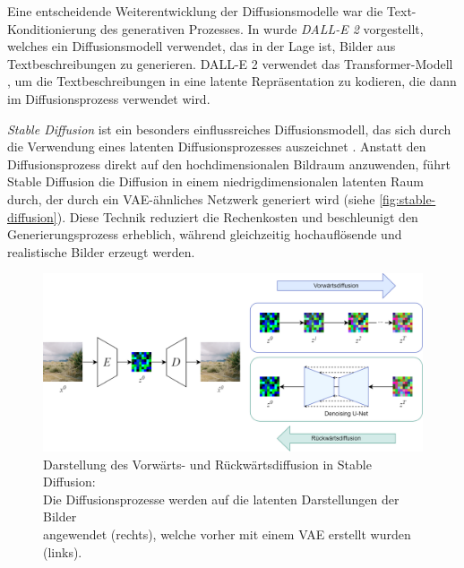 Eine entscheidende Weiterentwicklung der Diffusionsmodelle war die Text-Konditionierung des generativen Prozesses. In \parencite{Ramesh2022dalle2} wurde \emph{DALL-E 2} vorgestellt, welches ein Diffusionsmodell verwendet, das in der Lage ist, Bilder aus Textbeschreibungen zu generieren. DALL-E 2 verwendet das Transformer-Modell \parencite{Vaswani2017transformer}, um die Textbeschreibungen in eine latente Repräsentation zu kodieren, die dann im Diffusionsprozess verwendet wird.

\emph{Stable Diffusion} ist ein besonders einflussreiches Diffusionsmodell, das sich durch die Verwendung eines latenten Diffusionsprozesses auszeichnet \parencite{Rombach2022stablediffusion}. Anstatt den Diffusionsprozess direkt auf den hochdimensionalen Bildraum anzuwenden, führt Stable Diffusion die Diffusion in einem niedrigdimensionalen latenten Raum durch, der durch ein VAE-ähnliches Netzwerk generiert wird (siehe \autoref{fig:stable-diffusion}). Diese Technik reduziert die Rechenkosten und beschleunigt den Generierungsprozess erheblich, während gleichzeitig hochauflösende und realistische Bilder erzeugt werden.

\begin{figure}[t]
	\centering
	\includegraphics[width=\textwidth]{figure_diffusion_merged_custom.png}
	\caption[Darstellung des Vorwärts- und Rückwärtsdiffusion in Stable Diffusion: Die Diffusionsprozesse werden auf die latenten Darstellungen der Bilder angewendet (rechts), welche vorher mit einem VAE erstellt wurden (links).]{Darstellung des Vorwärts- und Rückwärtsdiffusion in Stable Diffusion:\\
		Die	Diffusionsprozesse werden auf die latenten Darstellungen der Bilder\\
		angewendet (rechts), welche vorher mit einem VAE erstellt wurden (links).}
	\label{fig:stable-diffusion}
\end{figure}

